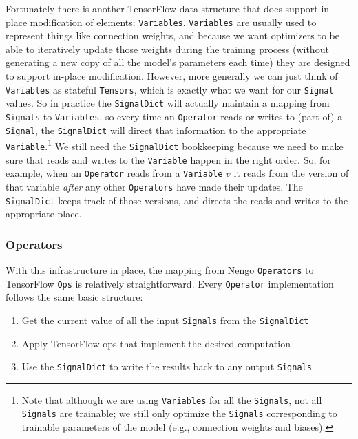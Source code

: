 \documentclass{article}
\begin{document}
Fortunately there is another TensorFlow data structure that does support in-place modification of elements: \texttt{Variables}.  \texttt{Variables} are usually used to represent things like connection weights, and because we want optimizers to be able to iteratively update those weights during the training process (without generating a new copy of all the model's parameters each time) they are designed to support in-place modification.  However, more generally we can just think of \texttt{Variables} as stateful \texttt{Tensors}, which is exactly what we want for our \texttt{Signal} values.  So in practice the \texttt{SignalDict} will actually maintain a mapping from \texttt{Signals} to \texttt{Variables}, so every time an \texttt{Operator} reads or writes to (part of) a \texttt{Signal}, the \texttt{SignalDict} will direct that information to the appropriate \texttt{Variable}.\footnote{Note that although we are using \texttt{Variables} for all the \texttt{Signals}, not all \texttt{Signals} are trainable; we still only optimize the \texttt{Signals} corresponding to trainable parameters of the model (e.g., connection weights and biases).}  We still need the \texttt{SignalDict} bookkeeping because we need to make sure that reads and writes to the \texttt{Variable} happen in the right order.  So, for example, when an \texttt{Operator} reads from a \texttt{Variable} $v$ it reads from the version of that variable \emph{after} any other \texttt{Operators} have made their updates.  The \texttt{SignalDict} keeps track of those versions, and directs the reads and writes to the appropriate place.

\subsubsection{Operators}

With this infrastructure in place, the mapping from Nengo \texttt{Operators} to TensorFlow \texttt{Ops} is relatively straightforward.  Every \texttt{Operator} implementation follows the same basic structure:

\begin{enumerate}
\item Get the current value of all the input \texttt{Signals} from the \texttt{SignalDict}
\item Apply TensorFlow ops that implement the desired computation
\item Use the \texttt{SignalDict} to write the results back to any output \texttt{Signals}
\end{enumerate}
\end{document}
